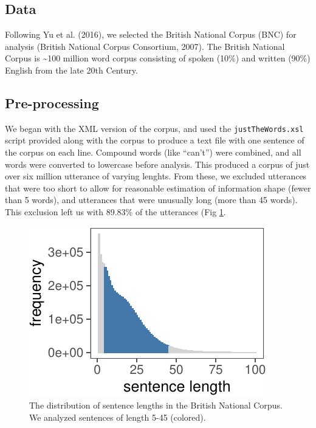 \documentclass[10pt, letterpaper]{article}
\newenvironment{CodeChunk}{}{}
\begin{document}
\hypertarget{data}{%
\subsection{Data}\label{data}}

Following Yu et al. (2016), we selected the British National Corpus
(BNC) for analysis (British National Corpus Consortium, 2007). The
British National Corpus is \textasciitilde{}100 million word corpus
consisting of spoken (10\%) and written (90\%) English from the late
20th Century.

\hypertarget{pre-processing}{%
\subsection{Pre-processing}\label{pre-processing}}

We began with the XML version of the corpus, and used the
\texttt{justTheWords.xsl} script provided along with the corpus to
produce a text file with one sentence of the corpus on each line.
Compound words (like ``can't'') were combined, and all words were
converted to lowercase before analysis. This produced a corpus of just
over six million utterance of varying lenghts. From these, we excluded
utterances that were too short to allow for reasonable estimation of
information shape (fewer than 5 words), and utterances that were
unusually long (more than 45 words). This exclusion left us with 89.83\%
of the utterances (Fig \ref{fig:bnc-lengths}.

\begin{CodeChunk}
\begin{figure}[tb]

{\centering \includegraphics{figs/bnc-lengths-1} 

}

\caption[The distribution of sentence lengths in the British National Corpus]{The distribution of sentence lengths in the British National Corpus. We analyzed sentences of length 5-45 (colored).}\label{fig:bnc-lengths}
\end{figure}
\end{CodeChunk}
\end{document}
